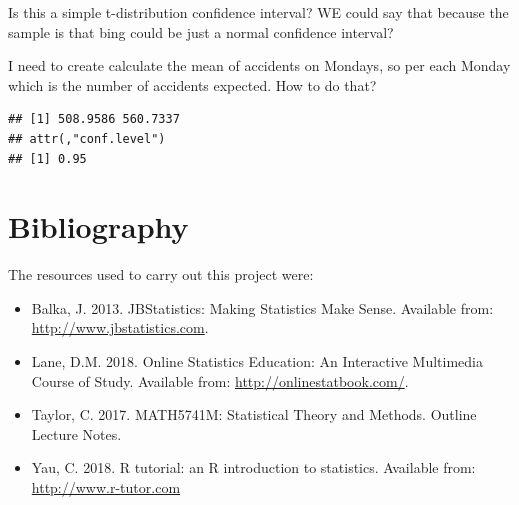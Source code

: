\documentclass[]{article}
\newenvironment{Shaded}{\begin{snugshade}}{\end{snugshade}}
\newcommand{\KeywordTok}[1]{\textcolor[rgb]{0.13,0.29,0.53}{\textbf{{#1}}}}
\newcommand{\CommentTok}[1]{\textcolor[rgb]{0.56,0.35,0.01}{\textit{{#1}}}}
\newcommand{\NormalTok}[1]{{#1}}
\providecommand{\tightlist}{%
  \setlength{\itemsep}{0pt}\setlength{\parskip}{0pt}}
\begin{document}
Is this a simple t-distribution confidence interval? WE could say that
because the sample is that bing could be just a normal confidence
interval?

I need to create calculate the mean of accidents on Mondays, so per each
Monday which is the number of accidents expected. How to do that?

\begin{Shaded}
\end{Shaded}

\begin{verbatim}
## [1] 508.9586 560.7337
## attr(,"conf.level")
## [1] 0.95
\end{verbatim}

\section{Bibliography}\label{bibliography}

The resources used to carry out this project were:

\begin{itemize}
\tightlist
\item
  Balka, J. 2013. JBStatistics: Making Statistics Make Sense. Available
  from: \url{http://www.jbstatistics.com}.
\item
  Lane, D.M. 2018. Online Statistics Education: An Interactive
  Multimedia Course of Study. Available from:
  \url{http://onlinestatbook.com/}.
\item
  Taylor, C. 2017. MATH5741M: Statistical Theory and Methods. Outline
  Lecture Notes.
\item
  Yau, C. 2018. R tutorial: an R introduction to statistics. Available
  from: \url{http://www.r-tutor.com}
\end{itemize}
\end{document}
